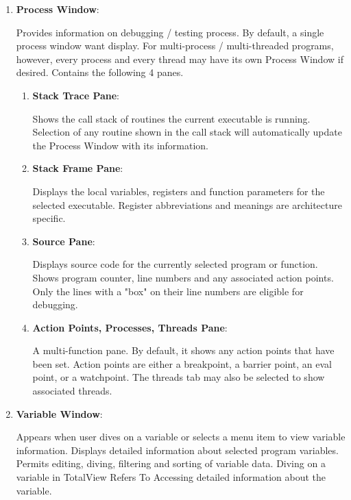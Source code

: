 \documentclass[10pt, letterpaper, twoside]{article}
\begin{document}
\begin{titlepage}
\begin{enumerate}
\item \textbf{Process Window}:

Provides information on debugging / testing process. By default, a single process window want display. For multi-process / multi-threaded programs, however, every process and every thread may have
its own Process Window if desired. Contains the following 4 panes. 

\begin{enumerate}
\item \textbf{Stack Trace Pane}:

Shows the call stack of routines the current executable is running. Selection of any routine shown in the call stack will automatically update the Process Window with its information. \\


\item \textbf{Stack Frame Pane}:

Displays the local variables, registers and function parameters for the selected executable. Register abbreviations and meanings are architecture specific. \\


\item \textbf{Source Pane}:

Displays source code for the currently selected program or function. Shows program counter, line numbers and any associated action points. Only the lines with a "box" on their line numbers are eligible for debugging. \\

\item \textbf{Action Points, Processes, Threads Pane}:

A multi-function pane. By default, it shows any action points
that have been set. Action points are either a breakpoint, a barrier point, an eval point, or a watchpoint. The threads tab may also be selected to show associated threads. \\
\end{enumerate}

\item \textbf{Variable Window}:

Appears when user dives on a variable or selects a menu item to view variable information. Displays detailed information about selected program variables. Permits editing, diving, filtering and sorting of variable data. Diving on a variable in TotalView Refers To Accessing detailed information about the variable.\\
\end{enumerate}


\end{titlepage}
\end{document}
